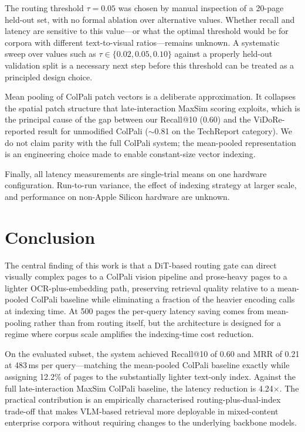 \documentclass[conference]{IEEEtran}
\begin{document}
The routing threshold $\tau = 0.05$ was chosen by manual inspection of a 20-page held-out set, with no formal ablation over alternative values. Whether recall and latency are sensitive to this value—or what the optimal threshold would be for corpora with different text-to-visual ratios—remains unknown. A systematic sweep over values such as $\tau \in \{0.02, 0.05, 0.10\}$ against a properly held-out validation split is a necessary next step before this threshold can be treated as a principled design choice.
 
Mean pooling of ColPali patch vectors is a deliberate approximation. It collapses the spatial patch structure that late-interaction MaxSim scoring exploits, which is the principal cause of the gap between our Recall@10 (0.60) and the ViDoRe-reported result for unmodified ColPali ($\sim$0.81 on the TechReport category). We do not claim parity with the full ColPali system; the mean-pooled representation is an engineering choice made to enable constant-size vector indexing.
 
Finally, all latency measurements are single-trial means on one hardware configuration. Run-to-run variance, the effect of indexing strategy at larger scale, and performance on non-Apple Silicon hardware are unknown.
 
\section{Conclusion}
 
The central finding of this work is that a DiT-based routing gate can direct visually complex pages to a ColPali vision pipeline and prose-heavy pages to a lighter OCR-plus-embedding path, preserving retrieval quality relative to a mean-pooled ColPali baseline while eliminating a fraction of the heavier encoding calls at indexing time. At 500 pages the per-query latency saving comes from mean-pooling rather than from routing itself, but the architecture is designed for a regime where corpus scale amplifies the indexing-time cost reduction.
 
On the evaluated subset, the system achieved Recall@10 of 0.60 and MRR of 0.21 at 483\,ms per query—matching the mean-pooled ColPali baseline exactly while assigning 12.2\% of pages to the substantially lighter text-only index. Against the full late-interaction MaxSim ColPali baseline, the latency reduction is 4.24$\times$. The practical contribution is an empirically characterised routing-plus-dual-index trade-off that makes VLM-based retrieval more deployable in mixed-content enterprise corpora without requiring changes to the underlying backbone models.
 
\end{document}
